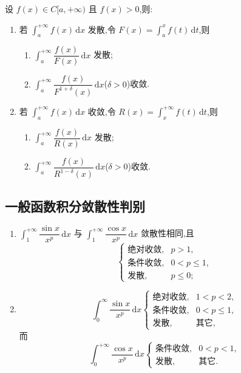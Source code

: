 \documentclass[../../数学分析培优讲义.tex]{subfiles}
\begin{document}
\begin{proposition}[\markstar]
设 $f(x)\in C\lbrack a,+\infty)$ 且 $f(x)>0$,则:
\begin{enumerate}[label=(\arabic*)]
    \item 若 $\displaystyle\int_a^{+\infty}f(x)\,\mathrm{d}x$ 发散,令 $\displaystyle F(x)=\int_a^xf(t)\,\mathrm{d}t$,则
    \begin{enumerate}[label=\textcircled{\arabic*}]
        \item $\displaystyle\int_a^{+\infty}\dfrac{f(x)}{F(x)}\,\mathrm{d}x$ 发散;
        \item $\displaystyle\int_a^{+\infty}\dfrac{f(x)}{F^{1+\delta}(x)}\,\mathrm{d}x$($\delta>0$)收敛.
    \end{enumerate}
    \item 若 $\displaystyle\int_a^{+\infty}f(x)\,\mathrm{d}x$ 收敛,令 $\displaystyle R(x)=\int_x^{+\infty}f(t)\,\mathrm{d}t$,则
    \begin{enumerate}[label=\textcircled{\arabic*}]
        \item $\displaystyle\int_a^{+\infty}\dfrac{f(x)}{R(x)}\,\mathrm{d}x$ 发散;
        \item $\displaystyle\int_a^{+\infty}\dfrac{f(x)}{R^{1-\delta}(x)}\,\mathrm{d}x$($\delta>0$)收敛.
    \end{enumerate}
\end{enumerate}
\end{proposition}



\subsection{一般函数积分敛散性判别}

\begin{proposition}[\markstar]
\begin{enumerate}[label=(\arabic*)]
    \item $\displaystyle\int_1^{+\infty}\dfrac{\sin x}{x^p}\,\mathrm{d}x$ 与 $\displaystyle\int_1^{+\infty}\dfrac{\cos x}{x^p}\,\mathrm{d}x$ 敛散性相同,且
    \[
        \begin{cases}
            \text{绝对收敛},&p>1,\\
            \text{条件收敛},&0<p\leq1,\\
            \text{发散},&p\leq0;
        \end{cases}
    \]
    \item
    \[
        \int_0^\infty\dfrac{\sin x}{x^p}\,\mathrm{d}x
        \begin{cases}
            \text{绝对收敛},&1<p<2,\\
            \text{条件收敛},&0<p\leq1,\\
            \text{发散},&\text{其它},
        \end{cases}
    \]
    而
    \[
        \int_0^{+\infty}\dfrac{\cos x}{x^p}\,\mathrm{d}x
        \begin{cases}
            \text{条件收敛},&0<p<1,\\
            \text{发散},&\text{其它}.
        \end{cases}
    \]
\end{enumerate}
\end{proposition}
\end{document}
